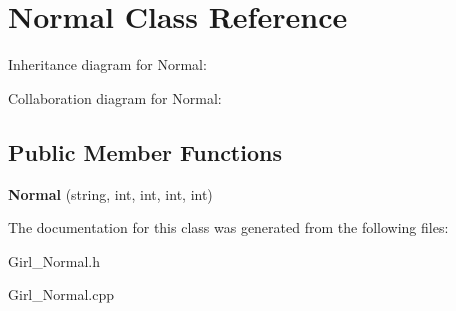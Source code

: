 \hypertarget{classNormal}{}\section{Normal Class Reference}
\label{classNormal}


Inheritance diagram for Normal\+:


Collaboration diagram for Normal\+:
\subsection*{Public Member Functions}
\begin{DoxyCompactItemize}
\item 
{\bfseries Normal} (string, int, int, int, int)\hypertarget{classNormal_afab36b69f8f028ec9a4b4a94847dd24f}{}\label{classNormal_afab36b69f8f028ec9a4b4a94847dd24f}

\end{DoxyCompactItemize}


The documentation for this class was generated from the following files\+:\begin{DoxyCompactItemize}
\item 
Girl\+\_\+\+Normal.\+h\item 
Girl\+\_\+\+Normal.\+cpp\end{DoxyCompactItemize}
